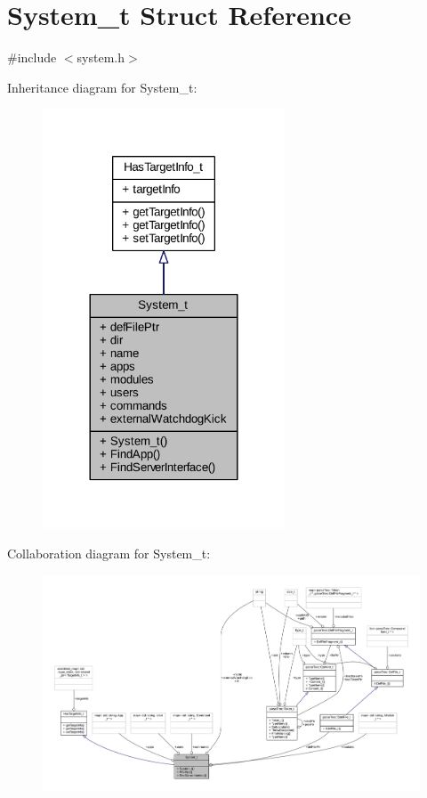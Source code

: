 \hypertarget{struct_system__t}{}\section{System\+\_\+t Struct Reference}
\label{struct_system__t}


{\ttfamily \#include $<$system.\+h$>$}



Inheritance diagram for System\+\_\+t\+:
\nopagebreak
\begin{figure}[H]
\begin{center}
\leavevmode
\includegraphics[width=204pt]{struct_system__t__inherit__graph}
\end{center}
\end{figure}


Collaboration diagram for System\+\_\+t\+:
\nopagebreak
\begin{figure}[H]
\begin{center}
\leavevmode
\includegraphics[width=350pt]{struct_system__t__coll__graph}
\end{center}
\end{figure}
